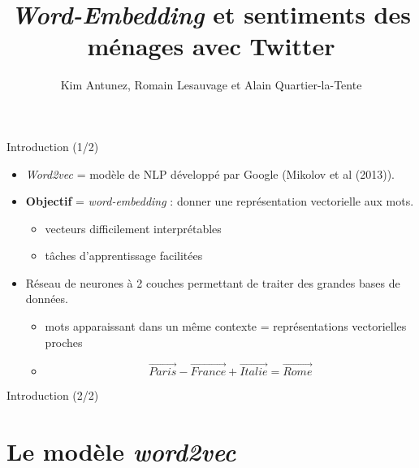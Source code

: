 \documentclass[10pt,xcolor=table,color={dvipsnames,usenames},ignorenonframetext,usepdftitle=false,french]{beamer}
\title{\emph{Word-Embedding} et sentiments des ménages avec Twitter}
\author{Kim Antunez, Romain Lesauvage et Alain Quartier-la-Tente}
\date{}
\providecommand{\tightlist}{%
  \setlength{\parskip}{0pt}
  }
\begin{document}
\begin{frame}
\titlepage
\end{frame}

\begin{frame}{Introduction (1/2)}
\protect\hypertarget{introduction-12}{}

\begin{itemize}
\item
  \emph{Word2vec} = modèle de NLP développé par Google (Mikolov et al
  (2013)).
\item
  \textbf{Objectif} = \emph{word-embedding} : donner une représentation
  vectorielle aux mots.

  \begin{itemize}
  \tightlist
  \item
    \faMinusSquare{} vecteurs difficilement interprétables
  \item
    \faPlusSquare{} tâches d'apprentissage facilitées
  \end{itemize}
\end{itemize}

\pause

\bigskip

\begin{itemize}
\tightlist
\item
  \faArrowCircleRight{} Réseau de neurones à 2 couches permettant de
  traiter des grandes bases de données.

  \begin{itemize}
  \tightlist
  \item
    mots apparaissant dans un même contexte = représentations
    vectorielles proches
  \item
    \[
    \overrightarrow{Paris} - \overrightarrow{France} + \overrightarrow{Italie} = \overrightarrow{Rome}
    \]
  \end{itemize}
\end{itemize}

\end{frame}

\begin{frame}{Introduction (2/2)}
\protect\hypertarget{introduction-22}{}

\resizebox{\textwidth}{!}{}

\end{frame}

\hypertarget{le-moduxe8le-word2vec}{%
\section{\texorpdfstring{Le modèle
\emph{word2vec}}{Le modèle word2vec}}\label{le-moduxe8le-word2vec}}
\end{document}
